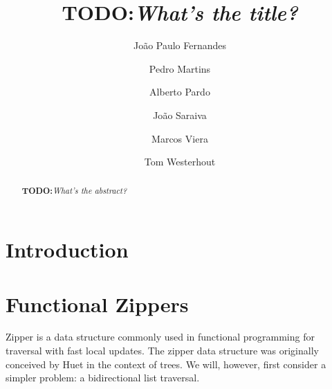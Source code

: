 \documentclass[runningheads]{llncs}
\newcommand{\TODO}[1]{{\color[rgb]{1,0,0}\textbf{TODO:}\textit{#1}}}
\begin{document}
\title{\TODO{What's the title?}}

\author{Jo{\~a}o Paulo Fernandes%
   \and Pedro Martins%
   \and Alberto Pardo%
   \and Jo{\~a}o Saraiva%
   \and Marcos Viera%
   \and Tom Westerhout%
}

\date{}

\maketitle

\begin{abstract}
  \TODO{What's the abstract?}

\end{abstract}

\section{Introduction}\label{sec:introduction}


\section{Functional Zippers}
  Zipper is a data structure commonly used in functional programming for
  traversal with fast local updates. The zipper data structure was originally
  conceived by Huet\cite{huet1997zipper} in the context of trees. We will,
  however, first consider a simpler problem: a bidirectional list traversal.
\end{document}
